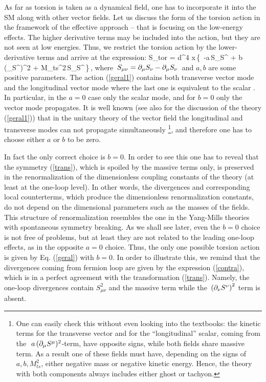 As far as torsion is taken as a dynamical field,
one has to incorporate it into the SM along with other vector 
fields. Let us discuss the form of the torsion action in the framework 
of the effective approach -- that is focusing on the low-energy 
effects. The higher derivative terms may be 
included into the action, but they are not seen at low energies.
Thus, we restrict the torsion action by the lower-derivative terms
and arrive at the expression:
\beq
S_{tor} = \int d^4 x\,\left\{\, 
-a\,S_{\mu\nu}S^{\mu\nu} + b\,(\pa_\mu S^\mu)^2
+ M_{ts}^2\,S_\mu S^\mu\,\right\}\,,
\label{geral1}
\eeq
where $\,S_{\mu\nu} = \partial_\mu S_\nu - \partial_\mu S_\nu\,$ and $a,b$
are some positive parameters. The action (\ref{geral1}) contains both
transverse vector mode and the longitudinal vector 
mode where the last one is equivalent to the scalar \cite{carroll}.
In particular, in the $a=0$ case only the scalar mode,
and for $b=0$ only the vector mode propagates.
It is well known \cite{vector} (see also \cite{carroll} for the
discussion of the theory (\ref{geral1})) that in the unitary
theory of the vector field the longitudinal and transverse
modes can not propagate simultaneously
\footnote{One can easily check this without even looking into 
the textbooks: the kinetic terms for the transverse vector and 
for the ``longitudinal'' scalar, coming from the 
$\,\,a\,(\partial_\mu S^\mu)^2$-term, have opposite signs, while 
both fields share massive term. As a result one of these fields 
must have, depending on the signs of $a,b,M_{ts}^2$, either 
negative mass or negative kinetic energy. Hence, the theory with 
both components always includes either ghost or tachyon.}, and 
therefore one has to choose  either $a$ or $b$ to be zero.

In fact the only correct choice is $b=0$. 
In order to see this one has to reveal
that the symmetry (\ref{trans}), which is spoiled by the massive terms
only, is preserved in the renormalization of the dimensionless coupling
constants of the theory (at least at the one-loop level). 
In other words, the divergences and
corresponding local counterterms, which produce the dimensionless
renormalization constants, do not depend on the dimensional parameters
such as the masses of the fields. This structure of renormalization 
resembles the one in the Yang-Mills theories with spontaneous
symmetry breaking. As we shall see later, 
even the $b=0$ choice is not free of problems, but at least 
they are not related to the leading one-loop effects, as in the
opposite $a=0$ choice. Thus, the only one possible 
torsion action is given by Eq. (\ref{geral}) with $b=0$.
In order to illustrate this, we remind that the divergences
coming from fermion loop are given by the expression (\ref{contra}),
which is in a perfect agreement with the transformation 
(\ref{trans}). Namely, the one-loop divergences contain $S_{\mu\nu}^2$ 
and the massive term while the $\,\left(\partial_\nu S^\nu\right)^2$ 
term is absent.

